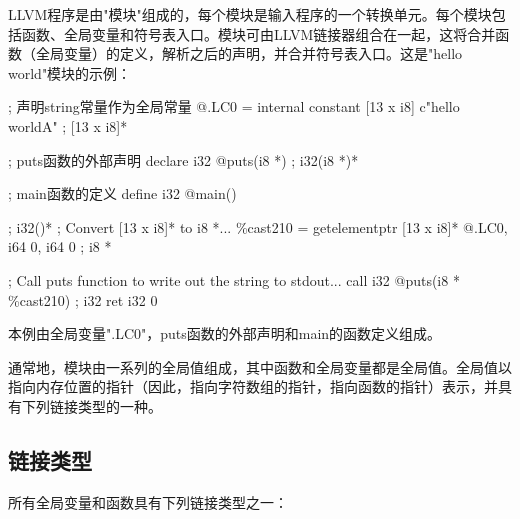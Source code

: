\documentclass[12pt,a4paper]{article}
\begin{document}
LLVM程序是由"模块"组成的，每个模块是输入程序的一个转换单元。每个模块包括函数、全局变量和符号表入口。模块可由LLVM链接器组合在一起，这将合并函数（全局变量）的定义，解析之后的声明，并合并符号表入口。这是"hello world"模块的示例：

; 声明string常量作为全局常量
@.LC0 = internal constant [13 x i8] c"hello world\0A"          ; [13 x i8]*

; puts函数的外部声明
declare i32 @puts(i8 *)                                           ; i32(i8 *)*

; main函数的定义
define i32 @main() {                                              ; i32()*
        ; Convert [13 x i8]* to i8  *...
        \%cast210 = getelementptr [13 x i8]* @.LC0, i64 0, i64 0   ; i8 *

        ; Call puts function to write out the string to stdout...
        call i32 @puts(i8 * \%cast210)                             ; i32
        ret i32 0
}

本例由全局变量".LC0"，puts函数的外部声明和main的函数定义组成。

通常地，模块由一系列的全局值组成，其中函数和全局变量都是全局值。全局值以指向内存位置的指针（因此，指向字符数组的指针，指向函数的指针）表示，并具有下列链接类型的一种。

\subsection{链接类型}

所有全局变量和函数具有下列链接类型之一：
\end{document}
